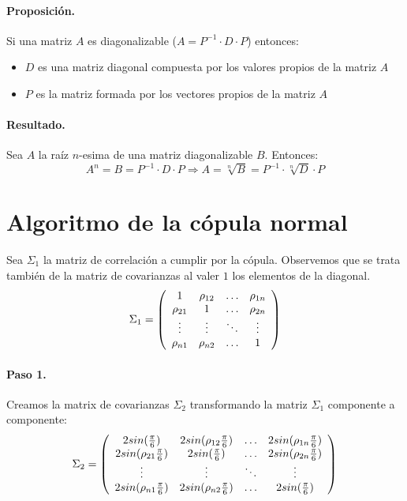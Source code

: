 \paragraph{Proposici\'on.}
Si una matriz $A$ es diagonalizable ($A = P^{-1} \cdot D \cdot P$) entonces: 
\begin{itemize}
\item $D$ es una matriz diagonal compuesta por los valores propios de la matriz $A$
\item $P$ es la matriz formada por los vectores propios de la matriz $A$
\end{itemize}

\paragraph{Resultado.}
Sea $A$ la ra\'iz $n$-esima de una matriz diagonalizable $B$. Entonces:
\begin{displaymath}
A^n = B = P^{-1} \cdot D \cdot P 
\Longrightarrow  
A = \sqrt[n]{B} = P^{-1} \cdot \sqrt[n]{D} \cdot P
\end{displaymath} 


\section{Algoritmo de la c\'opula normal}

Sea $\Sigma_1$ la matriz de correlaci\'on a cumplir por la c\'opula. Observemos 
que se trata tambi\'en de la matriz de covarianzas al valer $1$ los elementos
de la diagonal.
\begin{displaymath}
\Sigma_1 = \left( 
\begin{array}{cccc}
1          & \rho_{12} & \ldots & \rho_{1n} \cr
\rho_{21} & 1          & \ldots & \rho_{2n} \cr
\vdots    & \vdots    & \ddots & \vdots   \cr
\rho_{n1} & \rho_{n2} & \ldots & 1
\end{array}
\right)
\end{displaymath}

\paragraph{Paso 1.} Creamos la matrix de covarianzas $\Sigma_2$ transformando 
la matriz $\Sigma_1$ componente a componente:
\begin{displaymath}
\Sigma_2 = \left( 
\begin{array}{cccc}
2 sin(\frac{\pi}{6})           & 2 sin(\rho_{12} \frac{\pi}{6}) & \ldots & 2 sin(\rho_{1n} \frac{\pi}{6})\cr
2 sin(\rho_{21} \frac{\pi}{6}) & 2 sin(\frac{\pi}{6})           & \ldots & 2 sin(\rho_{2n} \frac{\pi}{6})\cr
\vdots                          & \vdots                          & \ddots  & \vdots   \cr
2 sin(\rho_{n1} \frac{\pi}{6}) & 2 sin(\rho_{n2} \frac{\pi}{6}) & \ldots & 2 sin(\frac{\pi}{6})
\end{array}
\right)
\end{displaymath}

